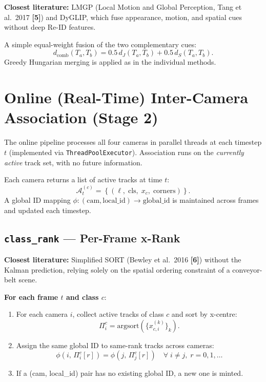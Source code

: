 \documentclass[11pt,a4paper]{article}
\newcommand{\code}[1]{\texttt{\small#1}}
\newcommand{\lit}[1]{\textbf{\small[#1]}}
\begin{document}
\textbf{Closest literature:} LMGP (Local Motion and Global Perception,
Tang et al.\ 2017 \lit{5}) and DyGLIP, which fuse appearance, motion, and
spatial cues without deep Re-ID features.

A simple equal-weight fusion of the two complementary cues:
\begin{equation}
  \boxed{d_{\text{comb}}(T_a, T_b) = 0.5\,d_J(T_a, T_b) + 0.5\,d_S(T_a, T_b).}
  \label{eq:combined}
\end{equation}
Greedy Hungarian merging is applied as in the individual methods.

\section{Online (Real-Time) Inter-Camera Association (Stage 2)}

The online pipeline processes all four cameras in parallel threads at each
timestep $t$ (implemented via \code{ThreadPoolExecutor}).  Association runs
on the \emph{currently active} track set, with no future information.

\vspace{4pt}
\noindent
Each camera returns a list of active tracks at time $t$:
\begin{equation*}
  \mathcal{A}_t^{(c)} = \left\{(\ell,\; \text{cls},\; x_c,\; \text{corners})\right\}.
\end{equation*}
A global ID mapping $\phi: (\text{cam}, \text{local\_id}) \to \text{global\_id}$
is maintained across frames and updated each timestep.

\subsection{\texttt{class\_rank} — Per-Frame x-Rank}

\textbf{Closest literature:} Simplified SORT (Bewley et al.\ 2016 \lit{6})
without the Kalman prediction, relying solely on the spatial ordering
constraint of a conveyor-belt scene.

\textbf{For each frame $t$ and class $c$}:
\begin{enumerate}[leftmargin=*,itemsep=2pt]
  \item For each camera $i$, collect active tracks of class $c$ and sort by
        x-centre:
        \begin{equation}
          \Pi^c_i = \text{argsort}\!\left(\{x^{(k)}_{c,i}\}_{k}\right).
        \end{equation}
  \item Assign the same global ID to same-rank tracks across cameras:
        \begin{equation}
          \phi\!\left(i,\, \Pi^c_i[r]\right)
          = \phi\!\left(j,\, \Pi^c_j[r]\right)
          \quad \forall\; i \ne j,\; r = 0, 1, \ldots
        \end{equation}
  \item If a (cam, local\_id) pair has no existing global ID, a new one is
        minted.
\end{enumerate}
\end{document}
